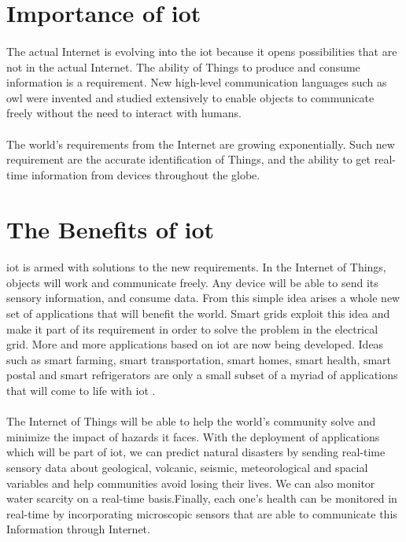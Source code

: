 \documentclass[oneside,12pt,a4paper,final]{book}
\begin{document}
\section{Importance of \gls{iot}}
\paragraph{}
The actual Internet is evolving into the \gls{iot} because it opens possibilities that are not in the actual Internet. The ability of Things to produce and consume information is a requirement. New high-level communication languages such as \gls{owl} were invented and studied extensively to enable objects to communicate freely without the need to interact with humans.
\paragraph{}
The world's requirements from the Internet are growing exponentially. Such new requirement are the accurate identification of Things, and the ability to get real-time information from devices throughout the globe.
\paragraph{}

\section{The Benefits of \gls{iot}}
\paragraph{}
\gls{iot} is armed with solutions to the new requirements. In the Internet of Things, objects will work and communicate freely. Any device will be able to send its sensory information, and consume data. From this simple idea arises a whole new set of applications that will benefit the world. Smart grids exploit this idea and make it part of its requirement in order to solve the problem in the electrical grid\cite{ref8}. More and more applications based on \gls{iot} are now being developed. Ideas such as smart farming, smart transportation, smart homes, smart health, smart postal and smart refrigerators are only a small subset of a myriad of applications that will come to life with \gls{iot} \cite{ref19}.
\paragraph{}
The Internet of Things will be able to help the world's community solve and minimize the impact of hazards it faces. With the deployment of applications which will be part of \gls{iot}, we can predict natural disasters by sending real-time sensory data about geological, volcanic, seismic, meteorological and spacial variables and help communities avoid losing their lives. We can also monitor water scarcity on a real-time basis.Finally, each one's health can be monitored in real-time by incorporating microscopic sensors that are able to communicate this Information through Internet.
\end{document}
